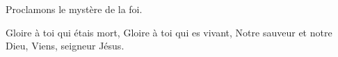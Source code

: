 Proclamons le mystère de la foi.

Gloire à toi qui étais mort,
Gloire à toi qui es vivant,
Notre sauveur et notre Dieu,
Viens, seigneur Jésus.
